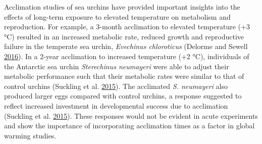 \documentclass[a4paper,10pt, oneside]{memoir}
\begin{document}
Acclimation studies of sea urchins have provided important insights into the effects of long-term exposure to elevated temperature on metabolism and reproduction.
For example, a 3-month acclimation to elevated temperature (+3 °C) resulted in an increased metabolic rate, reduced growth and reproductive failure in the temperate sea urchin, \emph{Evechinus chloroticus} (Delorme and Sewell \protect\hyperlink{ref-Delorme2016}{2016}).
In a 2-year acclimation to increased temperature (+2 °C), individuals of the Antarctic sea urchin \emph{Sterechinus neumayeri} were able to adjust their metabolic performance such that their metabolic rates were similar to that of control urchins (Suckling et al. \protect\hyperlink{ref-Suckling2015}{2015}).
The acclimated \emph{S. neumayeri} also produced larger eggs compared with control urchins, a response suggested to reflect increased investment in developmental success due to acclimation (Suckling et al. \protect\hyperlink{ref-Suckling2015}{2015}).
These responses would not be evident in acute experiments and show the importance of incorporating acclimation times as a factor in global warming studies.
\end{document}
